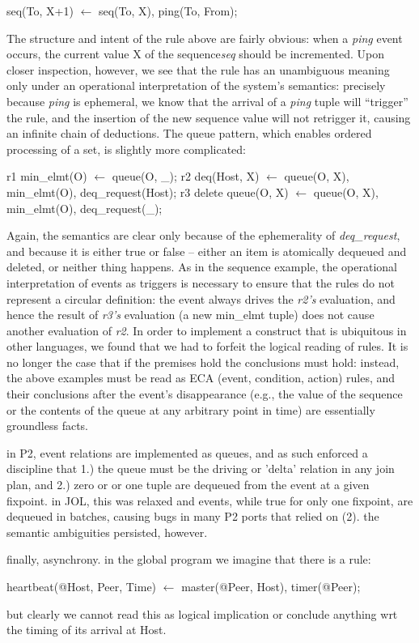 \begin{Dedalus}
seq(To, X+1) \(\leftarrow\) 
  seq(To, X), ping(To, From);
\end{Dedalus}

The structure and intent of the rule above are fairly obvious: when a \emph{ping} event
occurs, the current value X of the sequence\emph{seq} should be incremented.  Upon
closer inspection, however, we see that the rule has an unambiguous meaning only under
an operational interpretation of the system's semantics: precisely because \emph{ping}
is ephemeral, we know that the arrival of a \emph{ping} tuple will ``trigger'' the rule, and 
the insertion of the new sequence value will not retrigger it, causing an infinite chain of
deductions.  The queue pattern, which enables ordered processing of a set, is slightly 
more complicated:

\begin{Dedalus}
r1
min\_elmt(O) \(\leftarrow\)
  queue(O, _);
r2
deq(Host, X) \(\leftarrow\) 
  queue(O, X), min\_elmt(O), 
  deq\_request(Host);
r3
delete queue(O, X) \(\leftarrow\) 
  queue(O, X), min\_elmt(O), 
  deq\_request(\_);
\end{Dedalus}

Again, the semantics are clear only because of the ephemerality of \emph{deq\_request}, and because it is either true or false -- either an item is atomically dequeued and deleted, or neither thing happens.  As in the sequence example, the operational interpretation of events as
triggers is necessary to ensure that the rules do not represent a circular definition: the event 
always drives the \emph{r2's} evaluation, and hence the result of \emph{r3's} evaluation 
(a new min\_elmt tuple) does not cause another evaluation of \emph{r2}.  In order to 
implement a construct that is ubiquitous in other languages, we found that we had to 
forfeit the logical reading of rules.  It is no longer 
the case that if the premises hold the conclusions must hold: instead, the above examples
must be read as ECA (event, condition, action) rules, and their conclusions after the event's 
disappearance (e.g., the value of the sequence or the contents of the queue at any arbitrary 
point in time) are essentially groundless facts.


  in P2, event relations are implemented as queues, and as such enforced a discipline that 1.) the queue must be the driving or 'delta' relation in any join plan, and 2.) zero or or one tuple are dequeued from the event at a given fixpoint.  in JOL, this was relaxed and events, while true for only one fixpoint, are dequeued in batches, causing bugs in many P2 ports that relied on (2).  the semantic ambiguities persisted, however.

finally, asynchrony.  in the global program we imagine that there is a rule:

\begin{Dedalus}
heartbeat(@Host, Peer, Time) \(\leftarrow\) master(@Peer, Host), timer(@Peer);
\end{Dedalus}

but clearly we cannot read this as logical implication or conclude anything wrt the timing of its arrival at Host.


